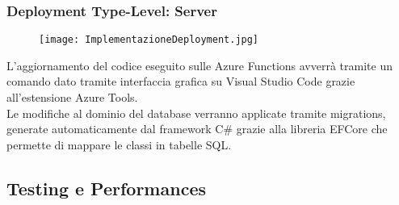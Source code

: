 \subsubsection{Deployment Type-Level: Server}

\begin{figure}[h!]
    \begin{center}
        \texttt{[image: ImplementazioneDeployment.jpg]}
    \end{center}
\end{figure}
L'aggiornamento del codice eseguito sulle Azure Functions avverrà tramite un comando dato tramite interfaccia grafica su Visual Studio Code grazie all'estensione Azure Tools.\\
Le modifiche al dominio del database verranno applicate tramite migrations, 
generate automaticamente dal framework C\# grazie alla libreria EFCore che permette di mappare le classi in tabelle SQL.\\

\subsection{Testing e Performances}
